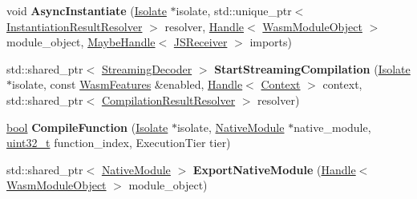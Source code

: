 \begin{DoxyCompactItemize}
\mbox{\label{classv8_1_1internal_1_1wasm_1_1WasmEngine_aefce4d20fbd0cf19f61519ad741bf1dd}} 
void {\bfseries Async\+Instantiate} (\mbox{\hyperlink{classv8_1_1internal_1_1Isolate}{Isolate}} $\ast$isolate, std\+::unique\+\_\+ptr$<$ \mbox{\hyperlink{classv8_1_1internal_1_1wasm_1_1InstantiationResultResolver}{Instantiation\+Result\+Resolver}} $>$ resolver, \mbox{\hyperlink{classv8_1_1internal_1_1Handle}{Handle}}$<$ \mbox{\hyperlink{classv8_1_1internal_1_1WasmModuleObject}{Wasm\+Module\+Object}} $>$ module\+\_\+object, \mbox{\hyperlink{classv8_1_1internal_1_1MaybeHandle}{Maybe\+Handle}}$<$ \mbox{\hyperlink{classv8_1_1internal_1_1JSReceiver}{J\+S\+Receiver}} $>$ imports)
\item 
\mbox{\label{classv8_1_1internal_1_1wasm_1_1WasmEngine_ab7e9fa577a810aa1ee66a110c7349d1f}} 
std\+::shared\+\_\+ptr$<$ \mbox{\hyperlink{classv8_1_1internal_1_1wasm_1_1StreamingDecoder}{Streaming\+Decoder}} $>$ {\bfseries Start\+Streaming\+Compilation} (\mbox{\hyperlink{classv8_1_1internal_1_1Isolate}{Isolate}} $\ast$isolate, const \mbox{\hyperlink{structv8_1_1internal_1_1wasm_1_1WasmFeatures}{Wasm\+Features}} \&enabled, \mbox{\hyperlink{classv8_1_1internal_1_1Handle}{Handle}}$<$ \mbox{\hyperlink{classv8_1_1internal_1_1Context}{Context}} $>$ context, std\+::shared\+\_\+ptr$<$ \mbox{\hyperlink{classv8_1_1internal_1_1wasm_1_1CompilationResultResolver}{Compilation\+Result\+Resolver}} $>$ resolver)
\item 
\mbox{\label{classv8_1_1internal_1_1wasm_1_1WasmEngine_a381b86c1c5f9a4b82b6172e343df5f74}} 
\mbox{\hyperlink{classbool}{bool}} {\bfseries Compile\+Function} (\mbox{\hyperlink{classv8_1_1internal_1_1Isolate}{Isolate}} $\ast$isolate, \mbox{\hyperlink{classv8_1_1internal_1_1wasm_1_1NativeModule}{Native\+Module}} $\ast$native\+\_\+module, \mbox{\hyperlink{classuint32__t}{uint32\+\_\+t}} function\+\_\+index, Execution\+Tier tier)
\item 
\mbox{\label{classv8_1_1internal_1_1wasm_1_1WasmEngine_a904933c8cee59fd4e7ba4e1d73afc6ad}} 
std\+::shared\+\_\+ptr$<$ \mbox{\hyperlink{classv8_1_1internal_1_1wasm_1_1NativeModule}{Native\+Module}} $>$ {\bfseries Export\+Native\+Module} (\mbox{\hyperlink{classv8_1_1internal_1_1Handle}{Handle}}$<$ \mbox{\hyperlink{classv8_1_1internal_1_1WasmModuleObject}{Wasm\+Module\+Object}} $>$ module\+\_\+object)

\end{DoxyCompactItemize}
